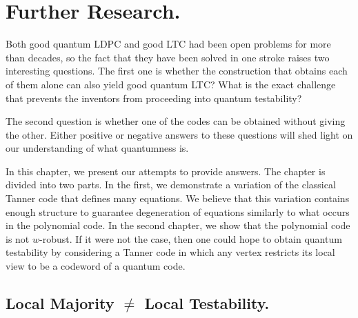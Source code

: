 
\chapter{Further Research.}
Both good quantum LDPC and good LTC had been open problems for more than decades, so the fact that they have been solved in one stroke raises two interesting questions. The first one is whether the construction that obtains each of them alone can also yield good quantum LTC? What is the exact challenge that prevents the inventors from proceeding into quantum testability?

The second question is whether one of the codes can be obtained without giving the other. Either positive or negative answers to these questions will shed light on our understanding of what quantumness is.

In this chapter, we present our attempts to provide answers. The chapter is divided into two parts. In the first, we demonstrate a variation of the classical Tanner code that defines many equations. We believe that this variation contains enough structure to guarantee degeneration of equations similarly to what occurs in the polynomial code. In the second chapter, we show that the polynomial code is not $w$-robust. If it were not the case, then one could hope to obtain quantum testability by considering a Tanner code in which any vertex restricts its local view to be a codeword of a quantum code.



\section{Local Majority $\neq$ Local Testability.}




